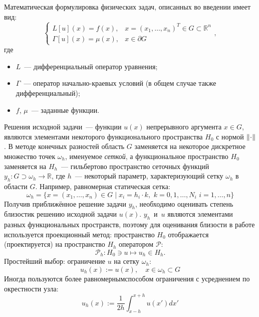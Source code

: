 Математическая формулировка физических задач, описанных во введении имеет вид:
\begin{equation}\label{eq:InitialProblem}
    \begin{cases}
        L[u](x) = f(x), & x = (x_1, \ldots, x_n)^{T} \in G \subset \mathbb{R}^n\\
        \Gamma[u](x) = \mu(x), & x \in \partial G
    \end{cases}, 
\end{equation}
где 
\begin{itemize}
    \item $L$~--- дифференциальный оператор уравнения;
    \item $\Gamma$~--- оператор начально-краевых условий (в общем случае также дифференциальный);
    \item $f$, $\mu$~--- заданные функции.
\end{itemize}
Решения исходной задачи~--- функции $u(x)$ непрерывного аргумента $x \in G$, являются элементами некоторого функционального пространства $H_0$ с нормой $\lVert\cdot\rVert$.
В методе конечных разностей область $G$ заменяется на некоторое дискретное множество точек $\omega_h$, именуемое \emph{сеткой}, а функциональное пространство $H_0$ заменяется на $H_h$~--- гильбертово пространство сеточных функций ${y_h : G \supset \omega_h \rightarrow \mathbb{R}}$, где $h$~--- некоторый параметр, характеризующий сетку $\omega_h$ в области $G$.
Например, равномерная статическая сетка:
\begin{equation*}
    \omega_h = \{x = (x_1, \ldots, x_n) \in G \mid x_i = h_i \cdot k,\,\, k = 0, 1, \ldots, N_i\,\, i = 1, \ldots, n\}
\end{equation*}
Получив приближённое решение задачи $y_h$, необходимо оценивать степень \glqq близости\grqq к решению исходной задачи $u(x)$.
$y_h$~и~$u$ являются элементами разных функциональных пространств, поэтому для оценивания близости в работе используется проекционный метод: пространство $H_0$ отображается (проектируется) на пространство $H_h$ оператором $\mathcal{P}$:
\begin{equation*}
    \mathcal{P}_h \colon H_0 \ni u \mapsto u_h \in H_h.
\end{equation*}
Простейший выбор: ограничение $u$ на сетку $\omega_h$:
\begin{equation*}
    u_h(x) := u(x),\quad x \in \omega_h \subset G
\end{equation*}
Иногда пользуются \glqq более равномерным\grqq способом ограничения с усреднением по окрестности узла:
\begin{equation*}
    u_h(x) := \frac{1}{2h} \int_{x - h}^{x + h} u(x') dx'
\end{equation*}
